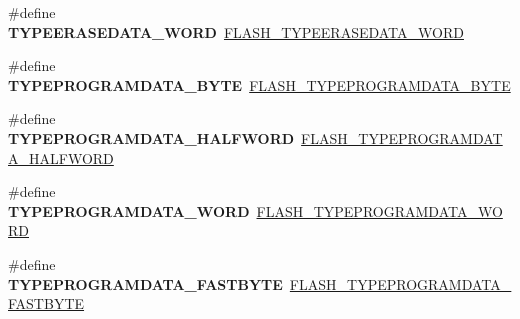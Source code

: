 \begin{DoxyCompactItemize}
\item 
\hypertarget{group___h_a_l___f_l_a_s_h___aliased___defines_gaf4f4f8533550f97be0c26f73d57c7287}{\#define {\bfseries T\-Y\-P\-E\-E\-R\-A\-S\-E\-D\-A\-T\-A\-\_\-\-W\-O\-R\-D}~\hyperlink{group___f_l_a_s_h_ex___type___erase___data_ga56f9f6067a72566ad838b6d0f31df0ad}{F\-L\-A\-S\-H\-\_\-\-T\-Y\-P\-E\-E\-R\-A\-S\-E\-D\-A\-T\-A\-\_\-\-W\-O\-R\-D}}\label{group___h_a_l___f_l_a_s_h___aliased___defines_gaf4f4f8533550f97be0c26f73d57c7287}

\item 
\hypertarget{group___h_a_l___f_l_a_s_h___aliased___defines_ga6864697548b848a7fc44453e1a2fb81c}{\#define {\bfseries T\-Y\-P\-E\-P\-R\-O\-G\-R\-A\-M\-D\-A\-T\-A\-\_\-\-B\-Y\-T\-E}~\hyperlink{group___f_l_a_s_h_ex___type___program___data_ga582ae928284a107072cc9d2964081f14}{F\-L\-A\-S\-H\-\_\-\-T\-Y\-P\-E\-P\-R\-O\-G\-R\-A\-M\-D\-A\-T\-A\-\_\-\-B\-Y\-T\-E}}\label{group___h_a_l___f_l_a_s_h___aliased___defines_ga6864697548b848a7fc44453e1a2fb81c}

\item 
\hypertarget{group___h_a_l___f_l_a_s_h___aliased___defines_ga0064d23e04c71357067fc6d55c4ef2d1}{\#define {\bfseries T\-Y\-P\-E\-P\-R\-O\-G\-R\-A\-M\-D\-A\-T\-A\-\_\-\-H\-A\-L\-F\-W\-O\-R\-D}~\hyperlink{group___f_l_a_s_h_ex___type___program___data_ga5273725206e7d7cda74148ba90c51c9f}{F\-L\-A\-S\-H\-\_\-\-T\-Y\-P\-E\-P\-R\-O\-G\-R\-A\-M\-D\-A\-T\-A\-\_\-\-H\-A\-L\-F\-W\-O\-R\-D}}\label{group___h_a_l___f_l_a_s_h___aliased___defines_ga0064d23e04c71357067fc6d55c4ef2d1}

\item 
\hypertarget{group___h_a_l___f_l_a_s_h___aliased___defines_ga97f70e9304478e184521f9e9e209fb38}{\#define {\bfseries T\-Y\-P\-E\-P\-R\-O\-G\-R\-A\-M\-D\-A\-T\-A\-\_\-\-W\-O\-R\-D}~\hyperlink{group___f_l_a_s_h_ex___type___program___data_ga84c4bbdde2127c45ff1dba539b96397f}{F\-L\-A\-S\-H\-\_\-\-T\-Y\-P\-E\-P\-R\-O\-G\-R\-A\-M\-D\-A\-T\-A\-\_\-\-W\-O\-R\-D}}\label{group___h_a_l___f_l_a_s_h___aliased___defines_ga97f70e9304478e184521f9e9e209fb38}

\item 
\hypertarget{group___h_a_l___f_l_a_s_h___aliased___defines_gabe017e7fb8bbfcb3e2c085ec36a74413}{\#define {\bfseries T\-Y\-P\-E\-P\-R\-O\-G\-R\-A\-M\-D\-A\-T\-A\-\_\-\-F\-A\-S\-T\-B\-Y\-T\-E}~\hyperlink{group___f_l_a_s_h_ex___type___program___data_ga991d2185fe7d6687bf9f74e305fa9388}{F\-L\-A\-S\-H\-\_\-\-T\-Y\-P\-E\-P\-R\-O\-G\-R\-A\-M\-D\-A\-T\-A\-\_\-\-F\-A\-S\-T\-B\-Y\-T\-E}}\label{group___h_a_l___f_l_a_s_h___aliased___defines_gabe017e7fb8bbfcb3e2c085ec36a74413}


\end{DoxyCompactItemize}
